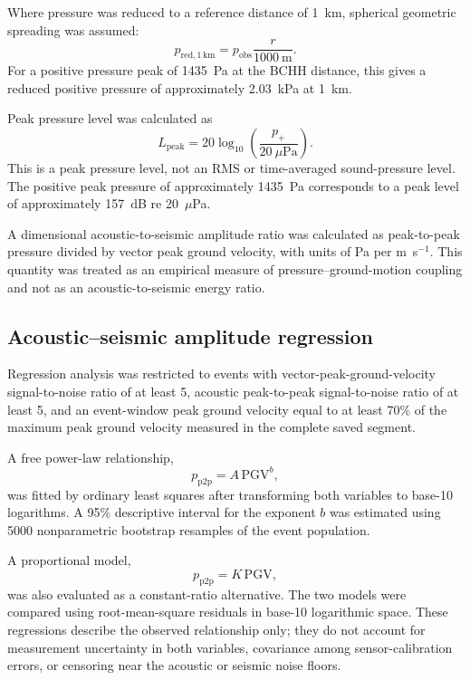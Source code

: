 \documentclass[]{seismica}
\begin{document}
Where pressure was reduced to a reference distance of 1~km, spherical geometric spreading was assumed:
\begin{equation}
  p_{\mathrm{red},1\,\mathrm{km}} = p_{\mathrm{obs}}\frac{r}{1000~\mathrm{m}}.
  \label{eq:reduced_pressure}
\end{equation}
For a positive pressure peak of 1435~Pa at the BCHH distance, this gives a reduced positive pressure of approximately 2.03~kPa at 1~km.

Peak pressure level was calculated as
\begin{equation}
  L_{\mathrm{peak}} = 20\log_{10}\left(\frac{p_+}{20~\mu\mathrm{Pa}}\right).
  \label{eq:peak_pressure_level}
\end{equation}
This is a peak pressure level, not an RMS or time-averaged sound-pressure level. The positive peak pressure of approximately 1435~Pa corresponds to a peak level of approximately 157~dB re 20~$\mu$Pa.

A dimensional acoustic-to-seismic amplitude ratio was calculated as peak-to-peak pressure divided by vector peak ground velocity, with units of Pa per m~s$^{-1}$. This quantity was treated as an empirical measure of pressure--ground-motion coupling and not as an acoustic-to-seismic energy ratio.

\subsection{Acoustic--seismic amplitude regression}

Regression analysis was restricted to events with vector-peak-ground-velocity signal-to-noise ratio of at least 5, acoustic peak-to-peak signal-to-noise ratio of at least 5, and an event-window peak ground velocity equal to at least 70\% of the maximum peak ground velocity measured in the complete saved segment.

A free power-law relationship,
\begin{equation}
  p_{\mathrm{p2p}} = A\,\mathrm{PGV}^{b},
  \label{eq:power_law}
\end{equation}
was fitted by ordinary least squares after transforming both variables to base-10 logarithms. A 95\% descriptive interval for the exponent $b$ was estimated using 5000 nonparametric bootstrap resamples of the event population.

A proportional model,
\begin{equation}
  p_{\mathrm{p2p}} = K\,\mathrm{PGV},
  \label{eq:proportional_model}
\end{equation}
was also evaluated as a constant-ratio alternative. The two models were compared using root-mean-square residuals in base-10 logarithmic space. These regressions describe the observed relationship only; they do not account for measurement uncertainty in both variables, covariance among sensor-calibration errors, or censoring near the acoustic or seismic noise floors.
\end{document}
